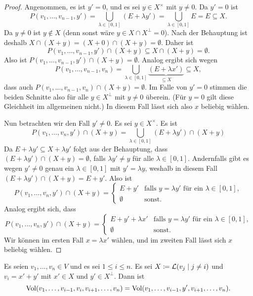 \documentclass[a4paper, 10pt]{scrartcl}
\begin{document}
\begin{proof}
  Angenommen, es ist $y' = 0$, und es sei $y \in X^\times$ mit $y \neq 0$.
  Da $y' = 0$ ist
  \[
      P(v_1, \dotsc, v_{n-1}, y')
    = \bigcup_{\lambda \in [0,1]} (E + \lambda y')
    = \bigcup_{\lambda \in [0,1]} E
    = E
    \subseteq X.
  \]
  Da $y \neq 0$ ist $y \notin X$ (denn sonst wäre $y \in X \cap X^\perp = 0$).
  Nach der Behauptung ist deshalb $X \cap (X + y) = (X + 0) \cap (X + y) = \emptyset$.
  Daher ist
  \[
              P(v_1, \dotsc, v_{n-1}, y') \cap (X + y)
    \subseteq X \cap (X + y)
    =         \emptyset.
  \]
  Also ist $P(v_1, \dotsc, v_{n-1}, y') \cap (X + y) = \emptyset$.
  Analog ergibt sich wegen
  \[
              P(v_1, \dotsc, v_{n-1}, v_n)
    =         \bigcup_{\lambda \in [0,1]} \underbrace{(E + \lambda x')}_{\subseteq X}
    \subseteq X,
  \]
  dass auch $P(v_1, \dotsc, v_{n-1}, v_n) \cap (X + y) = \emptyset$.
  Im Falle von $y' = 0$ stimmen die beiden Schnitte also für alle $y \in X^\perp$ mit $y \neq 0$ überein.
  (Für $y = 0$ gilt diese Gleichheit im allgemeinen nicht.)
  In diesem Fall lässt sich also $x$ beliebig wählen.
  
  Nun betrachten wir den Fall $y' \neq 0$.
  Es sei $y \in X^\times$.
  Es ist
  \[
      P(v_1, \dotsc, v_n, y') \cap (X + y)
    = \bigcup_{\lambda \in [0,1]} (E + \lambda y') \cap (X + y)
  \]
  Da $E + \lambda y' \subseteq X + \lambda y'$ folgt aus der Behauptung, dass $(E + \lambda y') \cap (X + y) = \emptyset$, falls $\lambda y' \neq y$ für alle $\lambda \in [0,1]$.
  Andernfalls gibt es wegen $y' \neq 0$ genau ein $\lambda \in [0,1]$ mit $y' = \lambda y$, weshalb in diesem Fall $(E + \lambda y') \cap (X + y) = E + y'$.
  Also ist
  \[
    P(v_1, \dotsc, v_n, y') \cap (X + y)
    =
      \begin{cases}
        E + y'     & \text{falls $y = \lambda y'$ für ein $\lambda \in [0,1]$},  \\
        \emptyset & \text{sonst}.
      \end{cases}
  \]
  Analog ergibt sich, dass
  \[
    P(v_1, \dotsc, v_n, y') \cap (X + y)
    =
      \begin{cases}
        E + y' + \lambda x' & \text{falls $y = \lambda y'$ für ein $\lambda \in [0,1]$},  \\
        \emptyset           & \text{sonst}.
      \end{cases}
  \]
  Wir können im ersten Fall $x = \lambda x'$ wählen, und im zweiten Fall lässt sich $x$ beliebig wählen.
\end{proof}


\begin{corollary}\label{cor: replacing by orthogonal part}
  Es seien $v_1, \dotsc, v_n \in V$ und es sei $1 \leq i \leq n$.
  Es sei $X \coloneqq \operatorname{\mathcal{L}}(v_j \mid j \neq i)$ und $v_i = x' + y'$ mit $x' \in X$ und $y' \in X^\perp$.
  Dann ist
  \[
      \operatorname{Vol}(v_1, \dotsc, v_{i-1}, v_i, v_{i+1}, \dotsc, v_n)
    = \operatorname{Vol}(v_1, \dotsc, v_{i-1}, y', v_{i+1}, \dotsc, v_n).
  \]
\end{corollary}
\end{document}
